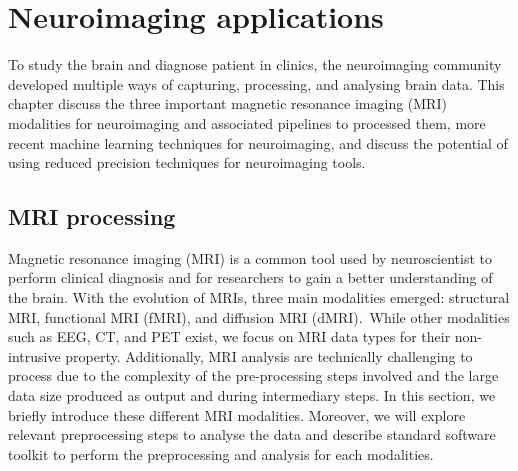 \chapter{Neuroimaging applications}
\label{ch:neuroimaging}
To study the brain and diagnose patient in clinics, the neuroimaging community
developed multiple ways of capturing, processing, and analysing brain data.
This chapter discuss the three important magnetic resonance imaging (MRI)
modalities for neuroimaging and associated pipelines to processed them, more
recent machine learning techniques for neuroimaging, and discuss the potential
of using reduced precision techniques for neuroimaging tools.

\section{MRI processing}
\label{sc:preprocessing}
Magnetic resonance imaging (MRI) is a common tool used by neuroscientist to perform clinical
diagnosis and for researchers to gain a better understanding of the brain.
With the evolution of MRIs, three main modalities emerged: structural MRI, 
functional MRI (fMRI), and diffusion MRI (dMRI).\
While other modalities such as EEG, CT, and PET exist, we focus on MRI data types
for their non-intrusive property.
Additionally, MRI analysis are technically challenging to process due to the complexity
of the pre-processing steps involved and the large data size produced as output 
and during intermediary steps.
In this section, we briefly introduce these different MRI modalities.
Moreover, we will explore relevant preprocessing steps to analyse the data and 
describe standard software toolkit to perform the preprocessing and analysis for
each modalities.

